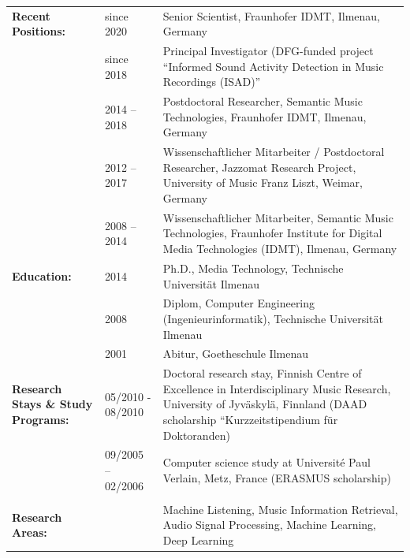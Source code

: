 \documentclass[8pt,a4paper]{article}
\begin{document}
\begin{tabular}{p{3.1cm}p{3.0cm}p{10cm}}
{\bf Recent Positions:}  
& since 2020  & Senior Scientist, Fraunhofer IDMT, Ilmenau, Germany \\

& since 2018 & Principal Investigator (DFG-funded project ``Informed Sound Activity Detection in Music Recordings (ISAD)'' \\

& 2014 -- 2018 & Postdoctoral Researcher, Semantic Music Technologies, Fraunhofer IDMT, Ilmenau, Germany \\
{\bf } & 2012 -- 2017 &	Wissenschaftlicher Mitarbeiter / Postdoctoral Researcher, Jazzomat Research Project, University of Music Franz Liszt, Weimar, Germany\\
{\bf } & 2008 -- 2014 &	Wissenschaftlicher Mitarbeiter, Semantic Music Technologies, Fraunhofer Institute for Digital Media Technologies (IDMT), Ilmenau, Germany \bigskip\\
%
{\bf Education:}  
{\bf } & 2014 &	Ph.D., Media Technology, Technische Universit{\"a}t Ilmenau\\
{\bf } & 2008 &	Diplom, Computer Engineering (Ingenieurinformatik), Technische Universit{\"a}t Ilmenau\\
{\bf } & 2001 &	Abitur, Goetheschule Ilmenau \bigskip\\
%
{\bf Research Stays \& Study Programs:}&
 05/2010 - 08/2010 & Doctoral research stay, Finnish Centre of Excellence in Interdisciplinary Music Research, University of Jyv{\"a}skyl{\"a}, Finnland (DAAD scholarship ``Kurzzeitstipendium f{\"u}r Doktoranden)\\
{\bf } & 09/2005 -- 02/2006 & Computer science study at Universit{\'e} Paul Verlain, Metz, France (ERASMUS scholarship)\\
\bigskip\\
%
{\bf Research Areas:}& 
{\bf } & Machine Listening, Music Information Retrieval, Audio Signal Processing, Machine Learning, Deep Learning
\end{tabular}

\pagebreak[4]\clearpage
\end{document}
